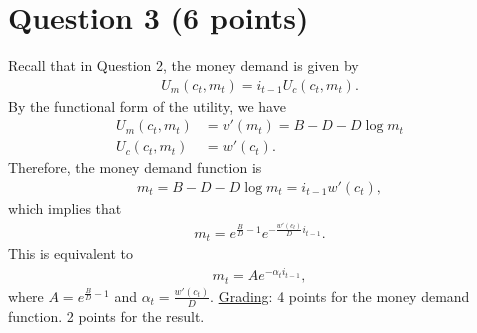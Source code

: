 \documentclass[12pt]{article}
\begin{document}
\section*{Question 3 (6 points)}
Recall that in Question 2, the money demand is given by
\begin{align*}
    U_m(c_t, m_t) = i_{t-1} U_c(c_t, m_t).
\end{align*}
By the functional form of the utility, we have
\begin{align*}
    U_m(c_t, m_t) &= v'(m_t) = B - D - D\log m_t\\
    U_c(c_t, m_t) &= w'(c_t).
\end{align*}
Therefore, the money demand function is
\begin{align*}
    m_t = B - D -D \log m_t = i_{t-1} w'(c_t),
\end{align*}
which implies that
\begin{align*}
    m_t = e^{\frac{B}{D}-1} e^{-\frac{w'(c_t)}{D} i_{t-1}}.
\end{align*}
This is equivalent to
\begin{align*}
    m_t = A e^{- \alpha_t i_{t-1}},
\end{align*}
where $A = e^{\frac{B}{D}-1}$ and $\alpha_t = \frac{w'(c_t)}{D}$.
\underline{Grading}: 4 points for the money demand function. 2 points for the result.
\end{document}
